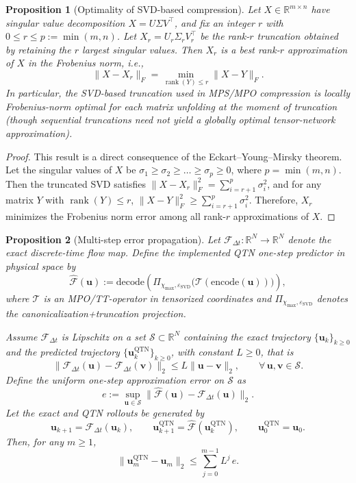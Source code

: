 \documentclass[letterpaper, 10 pt, conference]{ieeeconf}  %
\newtheorem{proposition}{Proposition}%
\begin{document}
\begin{proposition}[Optimality of SVD-based compression]
\label{prop:svd-optimal}
Let $X \in \mathbb{R}^{m \times n}$ have singular value decomposition
$X = U \Sigma V^\top$, and fix an integer $r$ with $0 \le r \le p:=\min(m,n)$.
Let $X_r = U_r \Sigma_r V_r^\top$ be the rank-$r$ truncation obtained by
retaining the $r$ largest singular values. Then $X_r$ is a best rank-$r$
approximation of $X$ in the Frobenius norm, i.e.,
\[
\|X - X_r\|_F
= \min_{\operatorname{rank}(Y) \le r} \|X - Y\|_F.
\]
In particular, the SVD-based truncation used in MPS/MPO compression is
\emph{locally} Frobenius-norm optimal for each matrix unfolding at the moment of
truncation (though sequential truncations need not yield a globally optimal
tensor-network approximation).
\end{proposition}

\begin{proof}
This result is a direct consequence of the Eckart--Young--Mirsky theorem.
Let the singular values of $X$ be
$\sigma_1 \ge \sigma_2 \ge \dots \ge \sigma_p \ge 0$, where $p = \min(m,n)$.
Then the truncated SVD satisfies
$\|X - X_r\|_F^2 = \sum_{i=r+1}^p \sigma_i^2$,
and for any matrix $Y$ with $\operatorname{rank}(Y) \le r$,
$\|X - Y\|_F^2 \ge \sum_{i=r+1}^p \sigma_i^2$.
Therefore, $X_r$ minimizes the Frobenius norm error among all rank-$r$
approximations of $X$.
\end{proof}

\begin{proposition}[Multi-step error propagation]
\label{prop:error-propagation}
Let $\mathcal{F}_{\Delta t}: \mathbb{R}^N \to \mathbb{R}^N$ denote the exact
discrete-time flow map. Define the implemented QTN one-step predictor in
physical space by
\[
\widehat{\mathcal{F}}(\mathbf{u})
:= \mathrm{decode}\!\left(
\Pi_{\chi_{\max},\varepsilon_{\mathrm{SVD}}}\big(
\mathcal{T}(\mathrm{encode}(\mathbf{u}))
\big)\right),
\]
where $\mathcal{T}$ is an MPO/TT-operator in tensorized coordinates and
$\Pi_{\chi_{\max},\varepsilon_{\mathrm{SVD}}}$ denotes the
canonicalization+truncation projection.

Assume $\mathcal{F}_{\Delta t}$ is Lipschitz on a set $\mathcal{S}\subset\mathbb{R}^N$
containing the exact trajectory $\{\mathbf{u}_k\}_{k\ge 0}$ and the predicted
trajectory $\{\mathbf{u}^{\mathrm{QTN}}_k\}_{k\ge 0}$, with constant $L\ge 0$, that is
\[
\|\mathcal{F}_{\Delta t}(\mathbf{u}) - \mathcal{F}_{\Delta t}(\mathbf{v})\|_2
\le L \|\mathbf{u} - \mathbf{v}\|_2,
\qquad \forall\,\mathbf{u},\mathbf{v}\in\mathcal{S}.
\]
Define the uniform one-step approximation error on $\mathcal{S}$ as
\[
e := \sup_{\mathbf{u} \in \mathcal{S}}
\|\widehat{\mathcal{F}}(\mathbf{u}) - \mathcal{F}_{\Delta t}(\mathbf{u})\|_2.
\]
Let the exact and QTN rollouts be generated by
\[
\mathbf{u}_{k+1} = \mathcal{F}_{\Delta t}(\mathbf{u}_k),
\qquad
\mathbf{u}_{k+1}^{\mathrm{QTN}} = \widehat{\mathcal{F}}(\mathbf{u}_k^{\mathrm{QTN}}),
\qquad
\mathbf{u}_0^{\mathrm{QTN}}=\mathbf{u}_0.
\]
Then, for any $m \ge 1$,
\[
\|\mathbf{u}_{m}^{\mathrm{QTN}} - \mathbf{u}_{m}\|_2
\le
\sum_{j=0}^{m-1} L^{j}\, e.
\]
\end{proposition}
\end{document}
